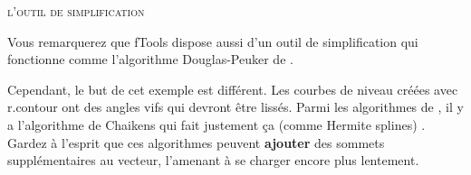 {%
\begin{Tip}\caption{\textsc{l'outil de simplification}}
Vous remarquerez que fTools dispose aussi d'un outil de simplification  qui fonctionne comme l'algorithme Douglas-Peuker de \grass {}.
\end{Tip}

Cependant, le but de cet exemple est différent. Les courbes de niveau créées avec r.contour ont des angles vifs qui devront être lissés. Parmi les algorithmes de , il y a l'algorithme de Chaikens qui fait justement ça (comme Hermite splines) . Gardez à l'esprit que ces algorithmes peuvent \textbf{ajouter} des sommets supplémentaires au vecteur, l'amenant à se charger encore plus lentement.

}
